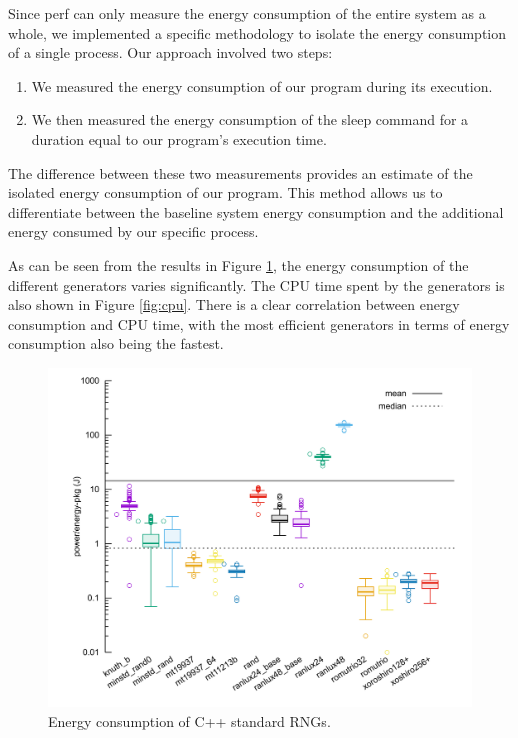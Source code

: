 \documentclass[dvipsnames,format=sigconf]{acmart}
\begin{document}
Since perf can only measure the energy consumption of the entire system as a whole, we implemented a specific methodology to isolate the energy consumption of a single process. Our approach involved two steps:

\begin{enumerate}
\item We measured the energy consumption of our program during its execution.
\item We then measured the energy consumption of the sleep command for a duration equal to our program's execution time.
\end{enumerate}

The difference between these two measurements provides an estimate of the isolated energy consumption of our program. This method allows us to differentiate between the baseline system energy consumption and the additional energy consumed by our specific process.

As can be seen from the results in Figure \ref{fig:pkg}, the energy consumption of the different generators varies significantly. The CPU time spent by the generators is also shown in Figure \ref{fig:cpu}. There is a clear correlation between energy consumption and CPU time, with the most efficient generators in terms of energy consumption also being the fastest.

\begin{figure}
\centering
\includegraphics[width=\linewidth]{pkg.png}
\caption{Energy consumption of C++ standard RNGs.}
\label{fig:pkg}
\end{figure}
\end{document}
